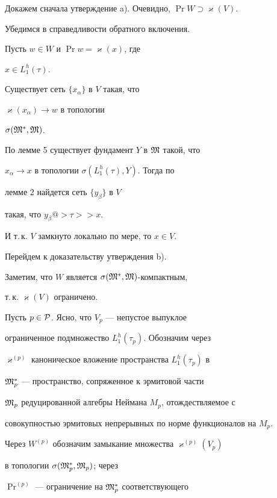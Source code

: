 \begin{pf}


Докажем сначала утверждение a). Очевидно, $\Pr W \supset \varkappa (V)$. 


Убедимся в справедливости обратного включения. 


Пусть $w \in W$ и $\Pr w=\varkappa (x)$, где 


$x \in L_1^h (\tau)$. 


Существует сеть $\{x_{\alpha}\}$ в $V$ такая, что 


$\varkappa (x_{\alpha}) \to w$ в топологии 


$\sigma ({\frak M}^*, {\frak M})$. 


По лемме 5 существует фундамент $Y$ в $\frak M$ такой, что 


$x_{\alpha} \to x$ в топологии $\sigma (L_1^h (\tau), Y)$. Тогда по 


лемме 2 найдется сеть $\{y_{\beta}\}$ в $V$ 


такая, что $y_{\beta}@>{\tau}>> x$. 


И т.\,к. $V$ замкнуто локально по мере, то $x \in V$.


\smallskip





Перейдем к доказательству утверждения b). 


Заметим, что $W$ является $\sigma ({\frak M}^*, {\frak M})$-компактным, 


т.\,к. $\varkappa (V)$ ограничено. 





Пусть $p \in {\cal P}$. Ясно, что $V_p$ --- непустое выпуклое


ограниченное подмножество $L_1^h (\tau_p)$. Обозначим через 


$\varkappa^{(p)}$ каноническое вложение пространства $L_1^h (\tau_p)$ в 


${\frak M}_p^*$ --- пространство, сопряженное к эрмитовой части 


${\frak M}_p$ редуцированной алгебры Неймана $M_p$, отождествляемое с 


совокупностью эрмитовых непрерывных по норме функционалов на $M_p$. 


Через $W^{(p)}$ обозначим замыкание множества $\varkappa^{(p)} (V_p)$ 


в топологии $\sigma ({\frak M}_p^*, {\frak M}_p)$; через 


$\Pr^{(p)}$ --- ограничение на ${\frak M}_p^*$ соответствующего



\end{pf}
